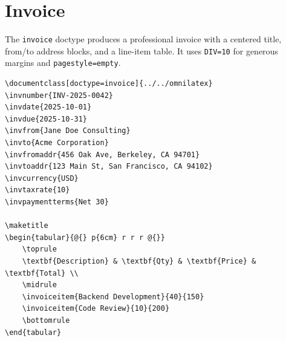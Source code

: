 \section{Invoice}
\label{sec:invoice}

The \texttt{invoice} doctype produces a professional invoice with a centered
title, from/to address blocks, and a line-item table.  It uses
\texttt{DIV=10} for generous margins and \texttt{pagestyle=empty}.

\begin{verbatim}
\documentclass[doctype=invoice]{../../omnilatex}
\invnumber{INV-2025-0042}
\invdate{2025-10-01}
\invdue{2025-10-31}
\invfrom{Jane Doe Consulting}
\invto{Acme Corporation}
\invfromaddr{456 Oak Ave, Berkeley, CA 94701}
\invtoaddr{123 Main St, San Francisco, CA 94102}
\invcurrency{USD}
\invtaxrate{10}
\invpaymentterms{Net 30}

\maketitle
\begin{tabular}{@{} p{6cm} r r r @{}}
    \toprule
    \textbf{Description} & \textbf{Qty} & \textbf{Price} & \textbf{Total} \\
    \midrule
    \invoiceitem{Backend Development}{40}{150}
    \invoiceitem{Code Review}{10}{200}
    \bottomrule
\end{tabular}

\end{verbatim}

